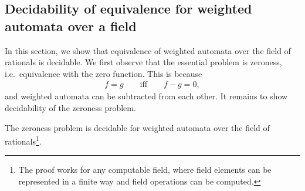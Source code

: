 \subsection{Decidability of equivalence for weighted automata over a field}
In this section, we show that equivalence of weighted automata over the field of rationals is decidable. We first observe that the essential problem is zeroness, i.e.~equivalence with the zero function. This is because 
\begin{align*}
f = g \qquad \text{iff} \qquad f-g = 0,
\end{align*}
and weighted automata can be subtracted from each other. It remains to show decidability of the zeroness problem.
\begin{theorem}\label{thm:zeroness-weighted-automata}
    The zeroness problem is decidable for weighted automata over the field of rationals\footnote{The proof works for any computable field, where field elements can be represented in a finite way and field operations can be computed.}.
\end{theorem}
